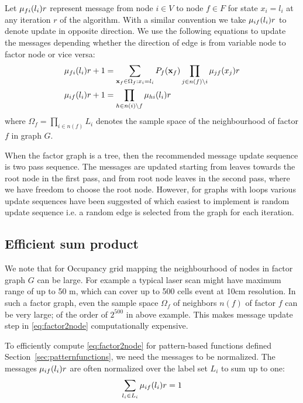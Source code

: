 \documentclass[letterpaper, 10 pt, conference]{ieeeconf} %
\begin{document}
Let $\mu_{fi}(l_i){r}$ represent message from
node $i \in V$ to node $f \in F$ for state $x_i = l_i$ at any iteration $r$ of the
algorithm. With a similar convention we take $\mu_{if}(l_i){r}$ to denote
update in opposite direction. We use the following equations to update the messages depending whether the direction of edge is from variable node to factor node or vice versa:
\begin{align}
  \mu_{fi}(l_i){r+1} &= \sum_{\mathbf{x}_f \in \Omega_f: x_i = l_i}P_f(\mathbf{x}_f)\prod_{j \in n(f) \setminus i}\mu_{jf}(x_j){r}
  \label{eq:factor2node}
  \\
  \mu_{if}(l_i){r+1} &= \prod_{h \in n(i) \setminus f}\mu_{hi}(l_i){r}
  \label{eq:node2factor}
\end{align}
where $\Omega_f = \prod_{i \in n(f)} L_i$ denotes the sample space of the neighbourhood of factor $f$ in graph $G$.

When the factor graph is a tree, then the recommended message update sequence
is two pass sequence. The messages are updated starting from leaves towards the
root node in the first pass, and from root node leaves in the second pass,
where we have freedom to choose the root node. However, for graphs with loops
various update sequences have been suggested of which easiest to implement is
random update sequence i.e. a random edge is selected from the graph for each iteration.

\subsection{Efficient sum product}
We note that for Occupancy grid mapping the neighbourhood of nodes in factor
graph $G$ can be large. For example a typical laser scan might have maximum
range of up to 50 m, which can cover up to 500 cells event at 10cm resolution.
In such a factor graph, even the sample space $\Omega_f$ of neighbors
$n(f)$ of factor $f$ can be very large; of the order of $2^{500}$  in above
example. This makes message update step in \eqref{eq:factor2node}
computationally expensive.

To efficiently compute \eqref{eq:factor2node} for pattern-based functions defined Section~\ref{sec:patternfunctions}, we need the messages to be normalized. The messages $\mu_{if}(l_i){r}$ are often normalized over the label set $L_i$ to sum up to one:
\begin{align}
  \sum_{l_i \in L_i} \mu_{if}(l_i){r} = 1
\end{align}
\end{document}

